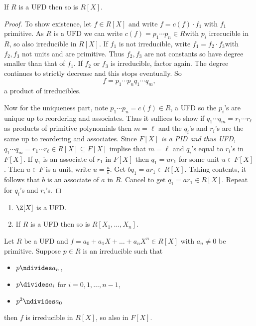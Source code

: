 \documentclass[a4paper]{article}
\theoremstyle{definition}
\begin{document}
\begin{theorem}
  If \(R\) is a UFD then so is \(R[X]\).
\end{theorem}

\begin{proof}
  To show existence, let \(f \in R[X]\) and write \(f = c(f) \cdot f_1\) with \(f_1\) primitive. As \(R\) is a UFD we can write \(c(f) = p_1 \cdots p_n \in R\)with \(p_i\) irrecucible in \(R\), so also irreducible in \(R[X]\). If \(f_1\) is not irreducible, write \(f_1 = f_2 \cdot f_3\)with \(f_2, f_3\) not units and are primitive. Thus \(f_2, f_3\) are not constants so have degree smaller than that of \(f_1\). If \(f_2\) or \(f_3\) is irreducible, factor again. The degree continues to strictly decrease and this stops eventually. So
  \[
    f = p_1 \cdots p_n q_1 \cdots q_m,
  \]
  a product of irreducibles.

  Now for the uniqueness part, note \(p_1 \cdots p_n = c(f) \in R\), a UFD so the \(p_i\)'s are unique up to reordering and associates. Thus it suffices to show if \(q_1 \cdots q_m = r_1 \cdots r_\ell\) as products of primitive polynomials then \(m = \ell\) and the \(q_i\)'s and \(r_i\)'s are the same up to reordering and associates. Since \emph{\(F[X]\) is a PID and thus UFD}, \(q_1 \cdots q_m = r_1 \cdots r_\ell \in R[X] \subseteq F[X]\) implise that \(m = \ell\) and \(q_i\)'s equal to \(r_i\)'s in \(F[X]\). If \(q_1\) is an associate of \(r_1\) in \(F[X]\) then \(q_1 = ur_1\) for some unit \(u \in F[X]\). Then \(u \in F\) is a unit, write \(u = \frac{a}{b}\). Get \(bq_1 = ar_1 \in R[X]\). Taking contents, it follows that \(b\) is an associate of \(a\) in \(R\). Cancel to get \(q_1 = ar_1 \in R[X]\). Repeat for \(q_i\)'s and \(r_i\)'s.
\end{proof}

\begin{eg}\leavevmode
  \begin{enumerate}
  \item \(\Z[X]\) is a UFD.
  \item If \(R\) is a UFD then so is \(R[X_1, \dots, X_n]\).
  \end{enumerate}
\end{eg}

\begin{proposition}
  Let \(R\) be a UFD and \(f = a_0 + a_1X + \dots + a_nX^n \in R[X]\) with \(a_n \neq 0\) be primitive. Suppose \(p \in R\) is an irreducible such that
  \begin{itemize}
  \item \(p \ndivides a_n\),
  \item \(p \divides a_i\) for \(i = 0, 1, \dots, n - 1\),
  \item \(p^2 \ndivides a_0\)
  \end{itemize}
  then \(f\) is irreducible in \(R[X]\), so also in \(F[X]\).
\end{proposition}
\end{document}
